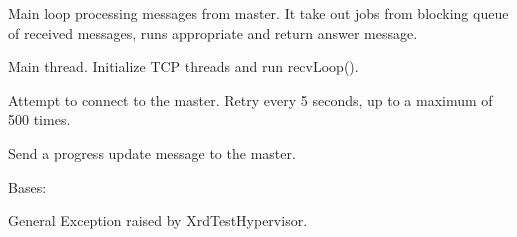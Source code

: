 \documentclass[letterpaper,10pt,english]{sphinxmanual}
\begin{document}
\begin{fulllineitems}
\begin{fulllineitems}
\end{fulllineitems}


\begin{fulllineitems}
\label{ref-manual/XrdTestHypervisor:XrdTestHypervisor.XrdTestHypervisor.recvLoop}
Main loop processing messages from master. It take out jobs
from blocking queue of received messages, runs appropriate and
return answer message.

\end{fulllineitems}


\begin{fulllineitems}
\label{ref-manual/XrdTestHypervisor:XrdTestHypervisor.XrdTestHypervisor.run}
Main thread. Initialize TCP threads and run recvLoop().

\end{fulllineitems}


\begin{fulllineitems}
\label{ref-manual/XrdTestHypervisor:XrdTestHypervisor.XrdTestHypervisor.tryConnect}
Attempt to connect to the master. Retry every 5 seconds, up to a 
maximum of 500 times.

\end{fulllineitems}


\begin{fulllineitems}
\label{ref-manual/XrdTestHypervisor:XrdTestHypervisor.XrdTestHypervisor.updateState}
Send a progress update message to the master.

\end{fulllineitems}


\end{fulllineitems}


\begin{fulllineitems}
\label{ref-manual/XrdTestHypervisor:XrdTestHypervisor.XrdTestHypervisorException}
Bases: 

General Exception raised by XrdTestHypervisor.

\end{fulllineitems}
\end{document}
